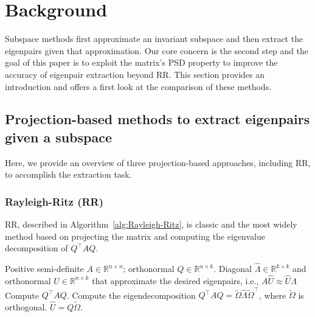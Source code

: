 \documentclass[onefignum,onetabnum]{siamart251216}
\begin{document}
\section{Background}
\label{sec:Background-and-Motivation-section}
Subspace methods first approximate an invariant subspace and then extract the eigenpairs given that approximation. Our core concern is the second step and the goal of this paper is to exploit the matrix's PSD property to improve the accuracy of eigenpair extraction beyond RR. This section provides an introduction and offers a first look at the comparison of these methods.

\subsection{Projection-based methods to extract eigenpairs given a subspace}\label{sec:methods}
Here, we provide an overview of three projection-based approaches, including RR, to accomplish the extraction task.

\subsubsection{Rayleigh-Ritz (RR)}
RR, described in Algorithm~\ref{alg:Rayleigh-Ritz}, is classic and the most widely method based on projecting the matrix and computing the eigenvalue decomposition of $Q^\top A Q$.

\begin{algorithm}
	 \small
	\renewcommand{\algorithmicrequire}{\textbf{Input:}}
	\renewcommand{\algorithmicensure}{\textbf{Output:}}
	\caption{RR}
	\begin{algorithmic}[1]
		\label{alg:Rayleigh-Ritz}
		\REQUIRE Positive semi-definite $A \in \mathbb{R}^{n \times n}$; orthonormal $Q \in \mathbb{R}^{n \times k}$.
		\ENSURE Diagonal $\hat{\Lambda} \in \mathbb{R}^{k \times k }$ and orthonormal $\hat{U} \in \mathbb{R}^{n \times k}$ that approximate the desired eigenpairs, i.e., $A\hat{U} \approx \hat{U}\hat{\Lambda}$
		\STATE Compute $Q^\top A Q$.
		\STATE Compute the eigendecomposition $Q^\top A Q = \widetilde{\Omega} \hat{\Lambda} \widetilde{\Omega}^\top$, where $\tilde{\Omega}$ is orthogonal.
		\STATE $\hat{U} = Q \widetilde{\Omega}$.
	\end{algorithmic} 
\end{algorithm}
\end{document}
